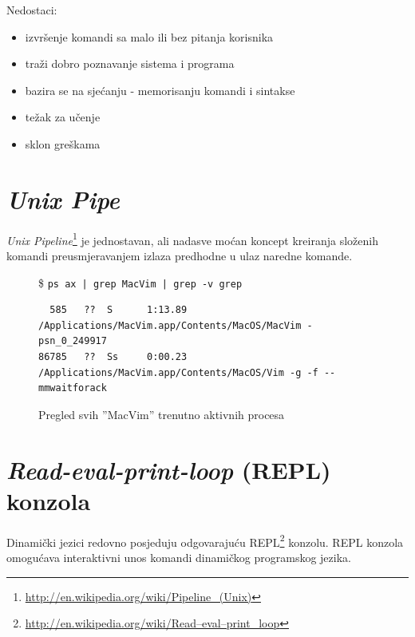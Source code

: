 \documentclass[times, utf8, seminar]{fit}
\begin{document}
Nedostaci:
\begin{itemize}
\item izvršenje komandi sa malo ili bez pitanja korisnika
\item traži dobro poznavanje sistema i programa
\item bazira se na sjećanju - memorisanju komandi i sintakse
\item težak za učenje
\item sklon greškama
\end{itemize}

%
%
%
%
%

\section{\emph{Unix Pipe}}

\emph{Unix Pipeline}\footnote{\url{http://en.wikipedia.org/wiki/Pipeline_(Unix)}} je jednostavan, ali nadasve moćan koncept kreiranja složenih komandi preusmjeravanjem izlaza predhodne u ulaz naredne komande.

\begin{figure}[H]
\$ \verb+ps ax | grep MacVim | grep -v grep+
\begin{lstlisting}
  585   ??  S      1:13.89 /Applications/MacVim.app/Contents/MacOS/MacVim -psn_0_249917
86785   ??  Ss     0:00.23 /Applications/MacVim.app/Contents/MacOS/Vim -g -f --mmwaitforack
\end{lstlisting}

\caption{Pregled svih ''MacVim'' trenutno aktivnih procesa}
\end{figure}


\section{\emph{Read-eval-print-loop} (REPL) konzola}

Dinamički jezici redovno posjeduju odgovarajuću REPL\footnote{\url{http://en.wikipedia.org/wiki/Read–eval–print_loop}} konzolu.
REPL konzola omogućava interaktivni unos komandi dinamičkog programskog jezika.
\end{document}
